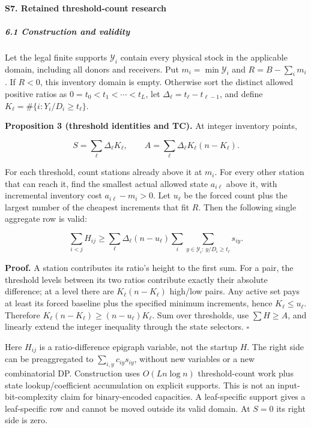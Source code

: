 \documentclass[
  american,
  11pt,
]{article}
\begin{document}
\paragraph{S7. Retained threshold-count
research}\label{s7.-retained-threshold-count-research}

\subparagraph{6.1 Construction and
validity}\label{construction-and-validity}

Let the legal finite supports \(\mathcal Y_i\) contain every physical
stock in the applicable domain, including all donors and receivers. Put
\(m_i=\min\mathcal Y_i\) and \(R=B-\sum_i m_i\). If \(R<0\), this
inventory domain is empty. Otherwise sort the distinct allowed positive
ratios as \(0=t_0<t_1<\cdots<t_L\), let
\(\Delta_\ell=t_\ell-t_{\ell-1}\), and define
\(K_\ell=\#\{i:Y_i/D_i\ge t_\ell\}\).


\textbf{Proposition 3 (threshold identities and TC).} At integer
inventory points,

\[
S=\sum_\ell\Delta_\ell K_\ell,\qquad
A=\sum_\ell\Delta_\ell K_\ell(n-K_\ell).
\]

For each threshold, count stations already above it at \(m_i\). For
every other station that can reach it, find the smallest actual allowed
state \(a_{i\ell}\) above it, with incremental inventory cost
\(a_{i\ell}-m_i>0\). Let \(u_\ell\) be the forced count plus the largest
number of the cheapest increments that fit \(R\). Then the following
single aggregate row is valid:

\[
\sum_{i<j}H_{ij}\ge
\sum_\ell\Delta_\ell(n-u_\ell)
\sum_i\sum_{y\in\mathcal Y_i:\,y/D_i\ge t_\ell}s_{iy}.
\tag{TC}
\]

\textbf{Proof.} A station contributes its ratio's height to the first
sum. For a pair, the threshold levels between its two ratios contribute
exactly their absolute difference; at a level there are
\(K_\ell(n-K_\ell)\) high/low pairs. Any active set pays at least its
forced baseline plus the specified minimum increments, hence
\(K_\ell\le u_\ell\). Therefore \(K_\ell(n-K_\ell)\ge(n-u_\ell)K_\ell\).
Sum over thresholds, use \(\sum H\ge A\), and linearly extend the
integer inequality through the state selectors. \(\square\)

Here \(H_{ij}\) is a ratio-difference epigraph variable, not the startup
\(H\). The right side can be preaggregated to
\(\sum_{i,y}c_{iy}s_{iy}\), without new variables or a new combinatorial
DP. Construction uses \(O(Ln\log n)\) threshold-count work plus state
lookup/coefficient accumulation on explicit supports. This is not an
input-bit-complexity claim for binary-encoded capacities. A
leaf-specific support gives a leaf-specific row and cannot be moved
outside its valid domain. At \(S=0\) its right side is zero.
\end{document}
